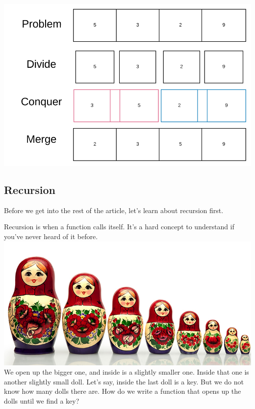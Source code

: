 \documentclass{article}
\begin{document}
\includegraphics[width=\textwidth,height=\textheight,keepaspectratio]{d.png}

\newpage
\subsection{Recursion}
Before we get into the rest of the article, let's learn about recursion first.

Recursion is when a function calls itself. It's a hard concept to understand if you've never heard of it before.
\includegraphics[width=\textwidth,height=\textheight,keepaspectratio]{e.png}
We open up the bigger one, and inside is a slightly smaller one. Inside that one is another slightly small doll. Let's say, inside the last doll is a key. But we do not know how many dolls there are. How do we write a function that opens up the dolls until we find a key?
\end{document}

